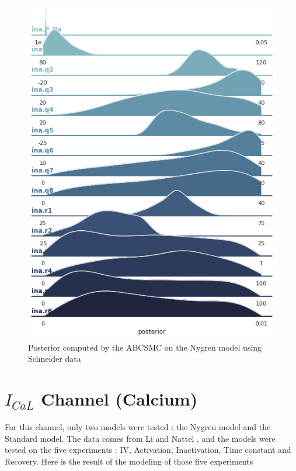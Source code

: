 \documentclass[11pt]{report}
\begin{document}
\begin{figure}[H]
    \centering
    \begin{measuredfigure}
\includegraphics[scale = 0.4 ]{figures/Ina_Nygren_sch/ina_nygren_post_all_sch_pop_10000.png}
    \captionsetup{singlelinecheck = false, format= hang, justification=centerlast, labelsep=space}
	\caption{Posterior computed by the ABCSMC on the Nygren \cite{Nygren1998} model using Schneider data \cite{Schneider1994}}
	\end{measuredfigure}
      \addtocounter{figure}{-1}
	\label{fig:InaParameterIdentifiabilityNygrenSchPost}
\end{figure}


\newpage

\section{$I_{CaL}$ Channel (Calcium)}

For this channel, only two models were tested : the Nygren \cite{Nygren1998} model and the Standard model. The data comes from Li and Nattel \cite{Li1997}, and the models were tested on the five experiments : IV, Activation, Inactivation, Time constant and Recovery. Here is the result of the modeling of those five experiments
\end{document}
